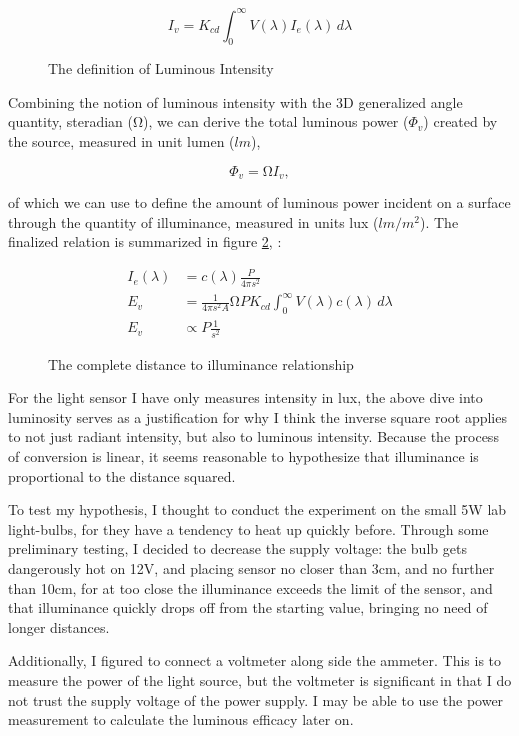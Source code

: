 \documentclass[a4paper,12pt]{article}
\begin{document}
\begin{figure}[h!]
    \[
     I_v = K_{cd} \int_{0}^{\infty} V(\lambda) I_e(\lambda) \, d\lambda
    \]
    \caption{The definition of Luminous Intensity}
    \label{eq:li}
\end{figure}

Combining the notion of luminous intensity with the 3D generalized angle quantity, steradian ($\si{\ohm}$), we can derive the total luminous power ($\Phi_v$) created by the source, measured in unit lumen ($\si{lm}$),

\[
    \Phi_v = \si{\ohm} I_v,
\]

of which we can use to define the amount of luminous power incident on a surface through the quantity of illuminance, measured in units lux ($\si{lm\per m^2}$). The finalized relation is summarized in figure \ref{eq:dti}, \parencite{intensityLuminous_se}:

\begin{figure}[h!]
 \centering
 \begin{align*}
 I_e(\lambda) &= c(\lambda) \frac{P}{4\pi s^2}\\
  E_v &= \frac{1}{4\pi s^2 A} \si{\ohm} P K_{cd} \int_{0}^{\infty} V(\lambda) c(\lambda) \, d\lambda\\
  E_v & \propto P\frac{1}{s^2}
 \end{align*}
 \caption{The complete distance to illuminance relationship}
 \label{eq:dti}
\end{figure}

For the light sensor I have only measures intensity in lux, the above dive into luminosity serves as a justification for why I think the inverse square root applies to not just radiant intensity, but also to luminous intensity. Because the process of conversion is linear, it seems reasonable to hypothesize that illuminance is proportional to the distance squared.

To test my hypothesis, I thought to conduct the experiment on the small 5W lab light-bulbs, for they have a tendency to heat up quickly before. Through some preliminary testing, I decided to decrease the supply voltage: the bulb gets dangerously hot on 12V, and placing sensor no closer than 3cm, and no further than 10cm, for at too close the illuminance exceeds the limit of the sensor, and that illuminance quickly drops off from the starting value, bringing no need of longer distances. 

Additionally, I figured to connect a voltmeter along side the ammeter. This is to measure the power of the light source, but the voltmeter is significant in that I do not trust the supply voltage of the power supply. I may be able to use the power measurement to calculate the luminous efficacy later on.
\end{document}
